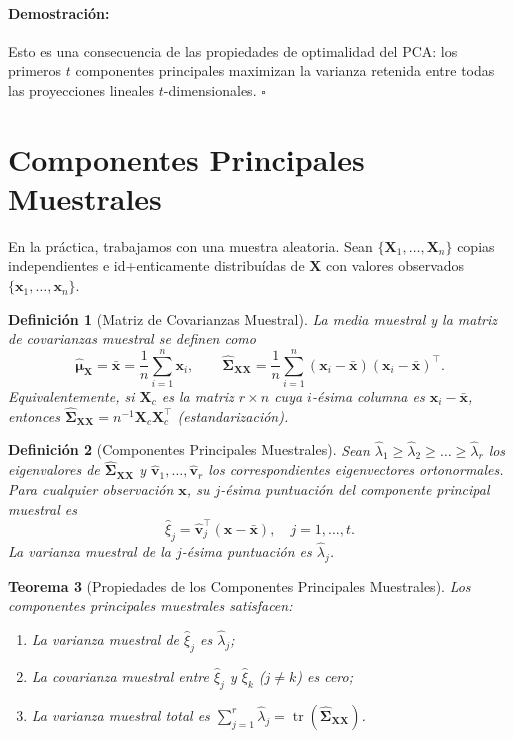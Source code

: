 \documentclass[11pt]{article}
\theoremstyle{plain}
\newtheorem{theorem}{Teorema}[section]
\newtheorem{definition}[theorem]{Definición}
\newenvironment{proof}{\paragraph{Demostración:}}{\hfill$\square$}
\newcommand{\X}{\mathbf{X}}
\newcommand{\bfv}{\mathbf{v}}
\newcommand{\bfx}{\mathbf{x}}
\newcommand{\bfX}{\mathbf{X}}
\newcommand{\bfmu}{\boldsymbol{\mu}}
\newcommand{\bfSigma}{\boldsymbol{\Sigma}}
\newcommand{\tr}{\operatorname{tr}}
\begin{document}
\begin{proof}
Esto es una consecuencia de las propiedades de optimalidad del PCA: los primeros \(t\) componentes principales maximizan la varianza retenida entre todas las proyecciones lineales \(t\)-dimensionales.
\end{proof}

\section{Componentes Principales Muestrales}

En la práctica, trabajamos con una muestra aleatoria. Sean \(\{\X_1, \dots, \X_n\}\) copias independientes e id+enticamente distribuídas de \(\X\) con valores observados \(\{\bfx_1, \dots, \bfx_n\}\).

\begin{definition}[Matriz de Covarianzas Muestral]
La media muestral y la matriz de covarianzas muestral se definen como
\[
\hat{\bfmu}_\X = \bar{\bfx} = \frac{1}{n} \sum_{i=1}^n \bfx_i,
\qquad
\hat{\bfSigma}_{\X\X} = \frac{1}{n} \sum_{i=1}^n (\bfx_i - \bar{\bfx})(\bfx_i - \bar{\bfx})^\top.
\]
Equivalentemente, si \(\bfX_c\) es la matriz \(r \times n\) cuya \(i\)-ésima columna es \(\bfx_i - \bar{\bfx}\), entonces \(\hat{\bfSigma}_{\X\X} = n^{-1} \bfX_c \bfX_c^\top\) (estandarización).
\end{definition}

\begin{definition}[Componentes Principales Muestrales]
Sean \(\hat{\lambda}_1 \ge \hat{\lambda}_2 \ge \dots \ge \hat{\lambda}_r\) los eigenvalores de \(\hat{\bfSigma}_{\X\X}\) y \(\hat{\bfv}_1, \dots, \hat{\bfv}_r\) los correspondientes eigenvectores ortonormales. Para cualquier observación \(\bfx\), su \(j\)-ésima \textit{puntuación del componente principal muestral} es
\[
\hat{\xi}_j = \hat{\bfv}_j^\top (\bfx - \bar{\bfx}), \quad j = 1, \dots, t.
\]
La varianza muestral de la \(j\)-ésima puntuación es \(\hat{\lambda}_j\).
\end{definition}

\begin{theorem}[Propiedades de los Componentes Principales Muestrales]
Los componentes principales muestrales satisfacen:
\begin{enumerate}
    \item La varianza muestral de \(\hat{\xi}_j\) es \(\hat{\lambda}_j\);
    \item La covarianza muestral entre \(\hat{\xi}_j\) y \(\hat{\xi}_k\) (\(j \ne k\)) es cero;
    \item La varianza muestral total es \(\sum_{j=1}^r \hat{\lambda}_j = \tr(\hat{\bfSigma}_{\X\X})\).
\end{enumerate}
\end{theorem}
\end{document}
